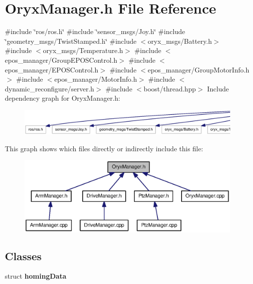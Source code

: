 \section{\-Oryx\-Manager.\-h \-File \-Reference}
\label{OryxManager_8h}
{\ttfamily \#include \char`\"{}ros/ros.\-h\char`\"{}}\*
{\ttfamily \#include \char`\"{}sensor\-\_\-msgs/\-Joy.\-h\char`\"{}}\*
{\ttfamily \#include \char`\"{}geometry\-\_\-msgs/\-Twist\-Stamped.\-h\char`\"{}}\*
{\ttfamily \#include $<$oryx\-\_\-msgs/\-Battery.\-h$>$}\*
{\ttfamily \#include $<$oryx\-\_\-msgs/\-Temperature.\-h$>$}\*
{\ttfamily \#include $<$epos\-\_\-manager/\-Group\-E\-P\-O\-S\-Control.\-h$>$}\*
{\ttfamily \#include $<$epos\-\_\-manager/\-E\-P\-O\-S\-Control.\-h$>$}\*
{\ttfamily \#include $<$epos\-\_\-manager/\-Group\-Motor\-Info.\-h$>$}\*
{\ttfamily \#include $<$epos\-\_\-manager/\-Motor\-Info.\-h$>$}\*
{\ttfamily \#include $<$dynamic\-\_\-reconfigure/server.\-h$>$}\*
{\ttfamily \#include $<$boost/thread.\-hpp$>$}\*
\-Include dependency graph for \-Oryx\-Manager.\-h\-:
\nopagebreak
\begin{figure}[H]
\begin{center}
\leavevmode
\includegraphics[width=350pt]{OryxManager_8h__incl}
\end{center}
\end{figure}
\-This graph shows which files directly or indirectly include this file\-:
\nopagebreak
\begin{figure}[H]
\begin{center}
\leavevmode
\includegraphics[width=350pt]{OryxManager_8h__dep__incl}
\end{center}
\end{figure}
\subsection*{\-Classes}
\begin{DoxyCompactItemize}
\item 
struct {\bf homing\-Data}
\end{DoxyCompactItemize}
